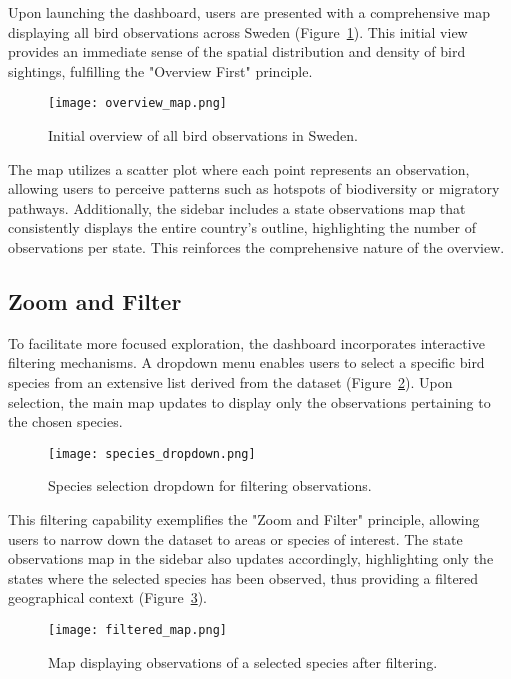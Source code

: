 Upon launching the dashboard, users are presented with a comprehensive map displaying all bird observations across Sweden (Figure~\ref{fig:overview}). This initial view provides an immediate sense of the spatial distribution and density of bird sightings, fulfilling the "Overview First" principle.

\begin{figure}[h] \centering \texttt{[image: overview\_map.png]} \caption{Initial overview of all bird observations in Sweden.} \label{fig:overview} \end{figure}

The map utilizes a scatter plot where each point represents an observation, allowing users to perceive patterns such as hotspots of biodiversity or migratory pathways. Additionally, the sidebar includes a state observations map that consistently displays the entire country's outline, highlighting the number of observations per state. This reinforces the comprehensive nature of the overview.

\subsection{Zoom and Filter}

To facilitate more focused exploration, the dashboard incorporates interactive filtering mechanisms. A dropdown menu enables users to select a specific bird species from an extensive list derived from the dataset (Figure~\ref{fig:dropdown}). Upon selection, the main map updates to display only the observations pertaining to the chosen species.

\begin{figure}[h] \centering \texttt{[image: species\_dropdown.png]} \caption{Species selection dropdown for filtering observations.} \label{fig:dropdown} \end{figure}

This filtering capability exemplifies the "Zoom and Filter" principle, allowing users to narrow down the dataset to areas or species of interest. The state observations map in the sidebar also updates accordingly, highlighting only the states where the selected species has been observed, thus providing a filtered geographical context (Figure~\ref{fig:filtered_map}).

\begin{figure}[h] \centering \texttt{[image: filtered\_map.png]} \caption{Map displaying observations of a selected species after filtering.} \label{fig:filtered_map} \end{figure}

